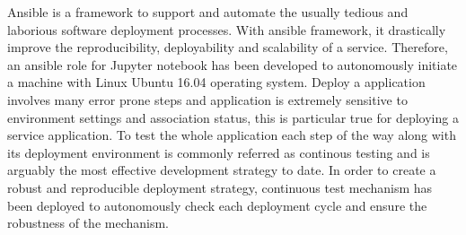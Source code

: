 Ansible is a framework to support and automate the usually tedious and laborious software deployment processes. With ansible framework, it drastically improve the reproducibility, deployability and scalability of a service. Therefore, 
an ansible role for Jupyter notebook has been developed to autonomously initiate a machine with Linux Ubuntu 16.04 operating system. 
Deploy a application involves many error prone steps and application is extremely sensitive to environment settings and association status, this is particular true for deploying a service application. To test the whole application each step of the way along with its deployment environment is commonly referred as continous testing and is arguably the most effective development strategy to date. In order to create a robust and reproducible deployment strategy, continuous test mechanism has been deployed to autonomously check each deployment cycle and ensure the robustness of the mechanism. 